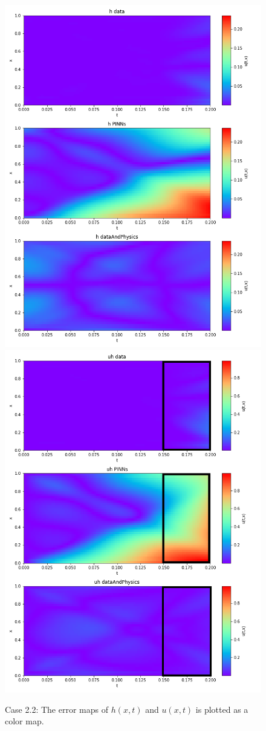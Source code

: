 \begin{figure}[h!]
\begin{center}
\includegraphics[width=0.45\linewidth]{../Code/B3/plots/h_errorplot_b2.png}
\includegraphics[width=0.45\linewidth]{../Code/B3/plots/uh_errorplot_b2.png}
\end{center}
\caption{Case 2.2: The error maps of $h(x, t)$ and $u(x,t)$ is plotted as a color map.}\label{fig:b2_swe_errors}
\end{figure}

